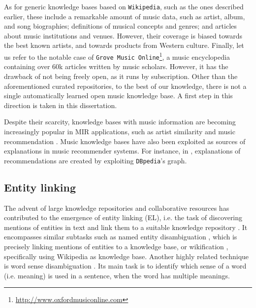 As for generic knowledge bases based on \texttt{Wikipedia}, such as the ones described earlier, these include a remarkable amount of music data, such as artist, album, and song biographies; definitions of musical concepts and genres; and articles about music institutions and venues. However, their coverage is biased towards the best known artists, and towards products from Western culture. Finally, let us refer to the notable case of \texttt{Grove Music Online}\footnote{\url{http://www.oxfordmusiconline.com}}, a music encyclopedia containing over 60k articles written by music scholars. However, it has the drawback of not being freely open, as it runs by subscription.
Other than the aforementioned curated repositories, to the best of our knowledge, there is not a single automatically learned open music knowledge base. A first step in this direction is taken in this dissertation.

Despite their scarcity, knowledge bases with music information are becoming increasingly popular in MIR applications, such as artist similarity and music recommendation \citep{Celma2008,Leal2012,Ostuni2013}.
Music knowledge bases have also been exploited as sources of explanations in music recommender systems. %
For instance, in \citep{Passant2010}, explanations of recommendations are created by exploiting \texttt{DBpedia}'s graph.%


\subsection{Entity linking}
\label{sec:SOA:nlu:entity_linking}

The advent of large knowledge repositories and collaborative resources has contributed to the emergence of entity linking (EL), i.e. the task of discovering mentions of entities in text and link them to a suitable knowledge repository \citep{Moroetal2014}. 
It encompasses similar subtasks such as named entity disambiguation \citep{BunescuandPasca2006}, which is precisely linking mentions of entities to a knowledge base, or wikification \citep{MihalceaandCsomai2007}, specifically using Wikipedia as knowledge base.
Another highly related technique is word sense disambiguation \citep{stevenson2003word}. Its main task is to identify which sense of a word (i.e. meaning) is used in a sentence, when the word has multiple meanings.

